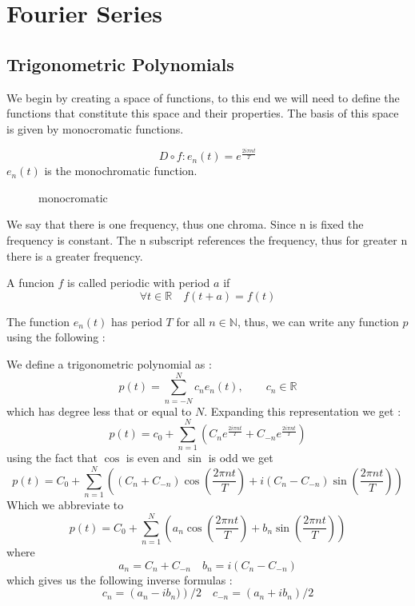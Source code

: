 \chapter{Fourier Series}
\section{Trigonometric Polynomials}
\label{sec:Trigonometric Polynomials}
We begin by creating a space of functions, to this end we will need to define the
functions that constitute this space and their properties. The basis of this space is
given by monocromatic functions.
\begin{defn}
    \[
        D \circ f : e_n(t) = e^ \frac{ 2i\pi nt  }{ T }   
    \]
    $ e_n(t) $ is the monochromatic function.     \label{def:Monocromatic Function}
\end{defn}

\begin{figure}[ht]
    \centering
    \caption{monocromatic}
    \label{fig:monocromatic}
\end{figure}
\newpage
We say that there is one frequency, thus one
    chroma. Since n is fixed the frequency is constant. The n subscript references the
    frequency, thus for greater n there is a greater frequency.   

\begin{defn}
    A funcion $ f $ is called periodic with period $ a $ if 
    \[
    \forall t\in \mathbb{R} \quad f(t+a) = f(t) 
\]
    \label{def:Periodic Function}
\end{defn}
The function $ e_n(t) $ has period $ T $ for all $ n \in \mathbb{N} $, thus, we can write
any function $ p $ using the following : 
\begin{defn}
    We define a trigonometric polynomial as : 
    \[
        p(t) = \sum_{n=-N}^{N} c_ne_n(t), \qquad c_n \in \mathbb{R} 
    \]
    which has degree less that or equal to $ N$. 
    Expanding this representation we get : 
    \[
        p(t) = c_0 + \sum_{n=1}^{N} \left( C_ne^ \frac{ 2i\pi nt }{ T } +  C_{-n}e^ \frac{
        2i\pi nt }{ T }\right) 
    \] 
    using the fact that $ \cos $ is even and $ \sin  $ is odd we get 
    \[
        p(t) = C_0 + \sum_{n=1}^{N} \left( \left( C_n + C_{-n}\right)\cos \left( \frac{ 2\pi nt
            }{ T } \right) +
        i\left( C_n - C_{-n}\right)\sin\left( \frac{ 2\pi nt }{ T}\right) \right)   
    \]
Which we abbreviate to 
\begin{equation}
        p(t) = C_0 + \sum_{n=1}^{N} \left( a_n\cos\left( \frac{ 2\pi nt }{ T } \right) +
        b_n\sin\left( \frac{ 2\pi nt }{ T } \right) \right)  
        \label{eq:fourier_decomp}
\end{equation}
    where 
    \[
        a_n = C_n + C_{-n} \quad b_n = i\left( C_n - C_{-n}\right) 
    \]
    which gives us the following inverse formulas : 
    \[
        c_n = \left( a_n - ib_n)\right) / 2 \quad c_{-n} = \left( a_n + ib_n \right) / 2
    \]
    \label{def:Trigonometric Polynom}
\end{defn}

